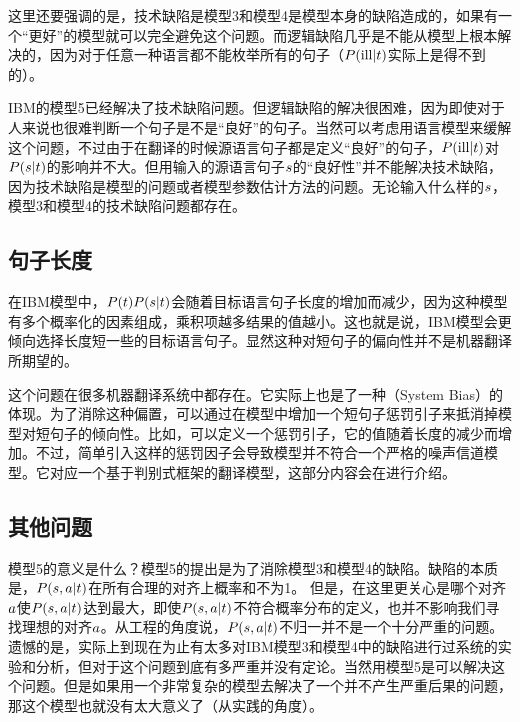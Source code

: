 \parinterval 这里还要强调的是，技术缺陷是模型3和模型4是模型本身的缺陷造成的，如果有一个“更好”的模型就可以完全避免这个问题。而逻辑缺陷几乎是不能从模型上根本解决的，因为对于任意一种语言都不能枚举所有的句子（${P}({\textrm{ill}|{t}})$实际上是得不到的）。

\parinterval IBM的模型5已经解决了技术缺陷问题。但逻辑缺陷的解决很困难，因为即使对于人来说也很难判断一个句子是不是“良好”的句子。当然可以考虑用语言模型来缓解这个问题，不过由于在翻译的时候源语言句子都是定义“良好”的句子，${P}({\textrm{ill}|{t}})$对${P}({s}| {t})$的影响并不大。但用输入的源语言句子${s}$的“良好性”并不能解决技术缺陷，因为技术缺陷是模型的问题或者模型参数估计方法的问题。无论输入什么样的${s}$，模型3和模型4的技术缺陷问题都存在。


\subsection{句子长度}

\parinterval 在IBM模型中，${P}({t}){P}({s}| {t})$会随着目标语言句子长度的增加而减少，因为这种模型有多个概率化的因素组成，乘积项越多结果的值越小。这也就是说，IBM模型会更倾向选择长度短一些的目标语言句子。显然这种对短句子的偏向性并不是机器翻译所期望的。

\parinterval 这个问题在很多机器翻译系统中都存在。它实际上也是了一种{\small{}}（System Bias）的体现。为了消除这种偏置，可以通过在模型中增加一个短句子惩罚引子来抵消掉模型对短句子的倾向性。比如，可以定义一个惩罚引子，它的值随着长度的减少而增加。不过，简单引入这样的惩罚因子会导致模型并不符合一个严格的噪声信道模型。它对应一个基于判别式框架的翻译模型，这部分内容会在{\chapterseven}进行介绍。


\subsection{其他问题}

\parinterval 模型5的意义是什么？模型5的提出是为了消除模型3和模型4的缺陷。缺陷的本质是，${P}({s},{a}| {t})$在所有合理的对齐上概率和不为1。 但是，在这里更关心是哪个对齐${a}$使${P}({s},{a}| {t})$达到最大，即使${P}({s},{a}|{t})$不符合概率分布的定义，也并不影响我们寻找理想的对齐${a}$。从工程的角度说，${P}({s},{a}| {t})$不归一并不是一个十分严重的问题。遗憾的是，实际上到现在为止有太多对IBM模型3和模型4中的缺陷进行过系统的实验和分析，但对于这个问题到底有多严重并没有定论。当然用模型5是可以解决这个问题。但是如果用一个非常复杂的模型去解决了一个并不产生严重后果的问题，那这个模型也就没有太大意义了（从实践的角度）。


